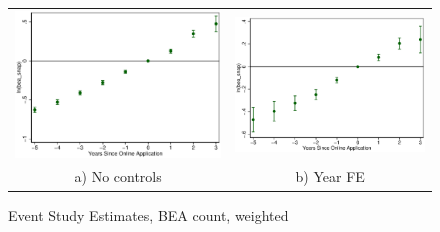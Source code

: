 \documentclass[11pt,letterpaper]{article}
\begin{document}
\begin{figure}\caption{Event Study Estimates, BEA count, weighted}
\begin{tabular}{cc}
\includegraphics[scale=0.57]{tabfig/evstu_bea_snap_total_pop_notr_5_3}&\includegraphics[scale=0.57]{tabfig/evstu_bea_snap_total_pop_year_5_3}\\
a) No controls&b) Year FE\\

\end{tabular}
\end{figure}
\end{document}
